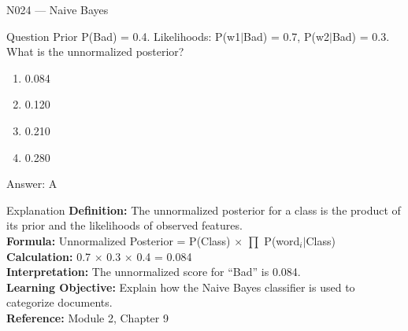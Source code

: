 \documentclass[aspectratio=169,8pt]{beamer}
\begin{document}
	\begin{frame}{N024 --- Naive Bayes}
		\begin{block}{Question}
			Prior P(Bad) = 0.4. Likelihoods: P(w1$|$Bad) = 0.7, P(w2$|$Bad) = 0.3. What is the unnormalized posterior?
			\begin{enumerate}
				\item 0.084
				\item 0.120
				\item 0.210
				\item 0.280
			\end{enumerate}
		\end{block}
		\begin{exampleblock}{Answer: A}\end{exampleblock}
		\begin{block}{Explanation}
			\textbf{Definition:} The unnormalized posterior for a class is the product of its prior and the likelihoods of observed features.\\
			\textbf{Formula:} Unnormalized Posterior = P(Class) $\times$ $\prod$ P(word$_{i}$$|$Class)\\
			\textbf{Calculation:} 0.7 $\times$ 0.3 $\times$ 0.4 = 0.084\\
			\textbf{Interpretation:} The unnormalized score for ``Bad'' is 0.084.\\
			\textbf{Learning Objective:} Explain how the Naive Bayes classifier is used to categorize documents.\\
			\textbf{Reference:} Module 2, Chapter 9
		\end{block}
	\end{frame}
	
\end{document}
